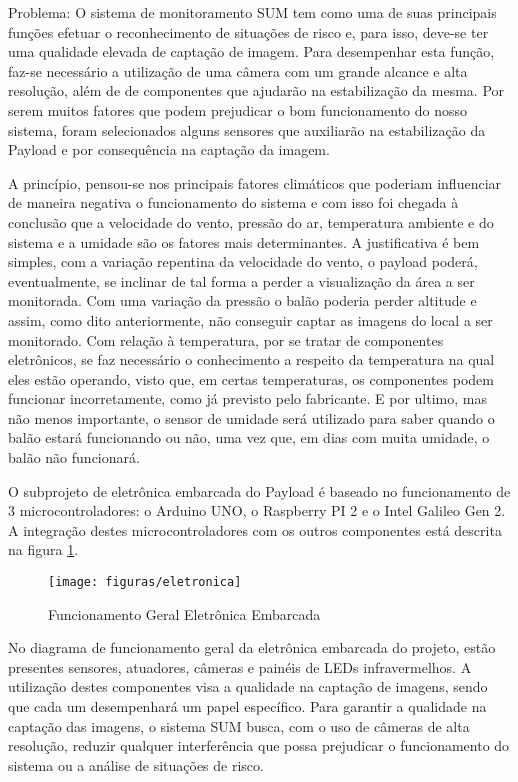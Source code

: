 	Problema: O sistema de monitoramento SUM tem como uma de suas principais funções efetuar o reconhecimento de situações de risco e, para isso, deve-se ter uma qualidade elevada de captação de imagem. Para desempenhar esta função, faz-se necessário a utilização de uma câmera com um grande alcance e alta resolução, além de de componentes que ajudarão na estabilização da mesma. Por serem muitos fatores que podem prejudicar o bom funcionamento do nosso sistema, foram selecionados alguns sensores que auxiliarão na estabilização da Payload e por consequência na captação da imagem.

	A princípio, pensou-se nos principais fatores climáticos que poderiam influenciar de maneira negativa o funcionamento do sistema e com isso foi chegada à conclusão que a velocidade do vento, pressão do ar, temperatura ambiente e do sistema e a umidade são os fatores mais determinantes. A justificativa é bem simples, com a variação repentina da velocidade do vento, o payload poderá, eventualmente, se inclinar de tal forma a perder a visualização da área a ser monitorada. Com uma variação da pressão o balão poderia perder altitude e assim, como dito anteriormente, não conseguir captar as imagens do local a ser monitorado. Com relação à temperatura, por se tratar de componentes eletrônicos, se faz necessário o conhecimento a respeito da temperatura na qual eles estão operando, visto que, em certas temperaturas, os componentes podem funcionar incorretamente, como já previsto pelo fabricante. E por ultimo, mas não menos importante, o sensor de umidade será utilizado para saber quando o balão estará funcionando ou não, uma vez que, em dias com muita umidade, o balão não funcionará.

	O subprojeto de eletrônica embarcada do Payload é baseado no funcionamento de 3 microcontroladores: o Arduino UNO, o Raspberry PI 2 e o Intel Galileo Gen 2. A integração destes microcontroladores com os outros componentes está descrita na figura \ref{img:func-geral-ele}.

\begin{figure}[H]
\centering
\caption{Funcionamento Geral Eletrônica Embarcada}
\texttt{[image: figuras/eletronica]}
\label{img:func-geral-ele}
\end{figure}

	No diagrama de funcionamento geral da eletrônica embarcada do projeto, estão presentes sensores, atuadores, câmeras e painéis de LEDs infravermelhos. A utilização destes componentes visa a qualidade na captação de imagens, sendo que cada um desempenhará um papel específico. Para garantir a qualidade na captação das imagens, o sistema SUM busca, com o uso de câmeras de alta resolução, reduzir qualquer interferência que possa prejudicar o funcionamento do sistema ou a análise de situações de risco.

